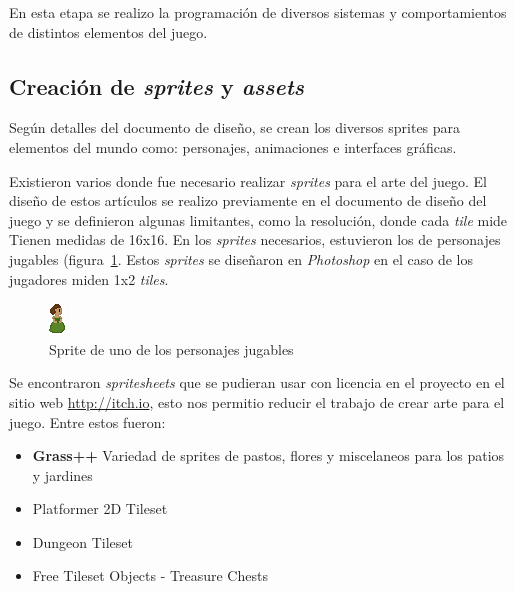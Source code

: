 En esta etapa se realizo la programación de diversos sistemas y comportamientos de distintos elementos del juego.

\subsection{Creación de \textit{sprites} y \textit{assets}}
Según detalles del documento de diseño, se crean los diversos sprites para elementos del
mundo como: personajes, animaciones e interfaces gráficas.

Existieron varios donde fue necesario realizar \textit{sprites} para el arte del juego. El diseño de estos artículos se realizo previamente en el documento de diseño del juego y se definieron algunas limitantes, como la resolución, donde cada \textit{tile} mide Tienen medidas de 16x16. En los \textit{sprites} necesarios, estuvieron los de personajes jugables (figura~\ref{fig:sprite_johanna}. Estos \textit{sprites} se diseñaron en \textit{Photoshop} en el caso de los jugadores miden 1x2 \textit{tiles}.

\begin{figure}[h]
    \centering
    \includegraphics[width=0.2\linewidth]{images/JohannaOrdonez.png}
    \caption{Sprite de uno de los personajes jugables}
    \label{fig:sprite_johanna}
\end{figure}

Se encontraron \textit{spritesheets} que se pudieran usar con licencia en el proyecto en el sitio web \url{http://itch.io}, esto nos permitio reducir el trabajo de crear arte para el juego.
Entre estos fueron:
\begin{itemize}
    \item \textbf{Grass++} Variedad de sprites de pastos, flores y miscelaneos para los patios y jardines
    \item Platformer 2D Tileset
    \item Dungeon Tileset
    \item Free Tileset Objects - Treasure Chests
\end{itemize}

